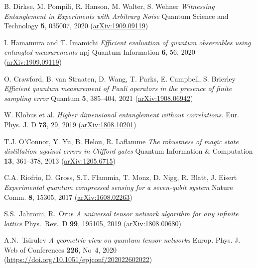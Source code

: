\documentclass[12pt,a4paper,twoside]{article}      %
\begin{document}



\begin{thebibliography}{999}


B. Dirkse, M. Pompili, R. Hanson, M. Walter, S. Wehner \textit{Witnessing Entanglement in Experiments with Arbitrary Noise} Quantum Science and Technology
\textbf{5}, 035007, 2020
(\href{http://arxiv.org/abs/1909.09119}{arXiv:1909.09119})

I. Hamamura and T. Imamichi \textit{Efficient evaluation of quantum observables using entangled measurements} npj Quantum Information \textbf{6}, 56, 2020
(\href{http://arxiv.org/abs/1909.09119}{arXiv:1909.09119})

O. Crawford, B. van Straaten, D. Wang, T. Parks, E. Campbell, S. Brierley \textit{Efficient quantum measurement of Pauli operators in the presence of finite sampling error} Quantum \textbf{5}, 385--404, 2021
(\href{http://arxiv.org/abs/1908.06942}{arXiv:1908.06942})

W. Klobus et al. \textit{Higher dimensional entanglement without correlations.} Eur. Phys. J. D \textbf{73}, 29, 2019
(\href{https://arxiv.org/abs/1808.10201}{arXiv:1808.10201})

T.J. O'Connor, Y. Yu, B. Helou, R. Laflamme \textit{The robustness of magic state distillation against errors in Clifford gates} Quantum Information \& Computation \textbf{13}, 361--378, 2013
(\href{http://arxiv.org/abs/1205.6715}{arXiv:1205.6715})

C.A. Riofrio, D. Gross, S.T. Flammia, T. Monz, D. Nigg, R. Blatt, J. Eisert \textit{Experimental quantum compressed sensing for a seven-qubit system} Nature Comm. \textbf{8}, 15305, 2017
(\href{http://arxiv.org/abs/1608.02263}{arXiv:1608.02263})

S.S.~Jahromi, R.~Orus \textit{A universal tensor network algorithm for any infinite lattice}
Phys.~Rev.~D \textbf{99}, 195105, 2019
(\href{http://arxiv.org/abs/1808.00680}{arXiv:1808.00680})

A.N.~Tsirulev \textit{A geometric view on quantum tensor networks} Europ. Phys. J. Web of Conferences \textbf{226}, No~4, 2020\\ (\url{https://doi.org/10.1051/epjconf/202022602022})


\end{thebibliography}
\end{document}
